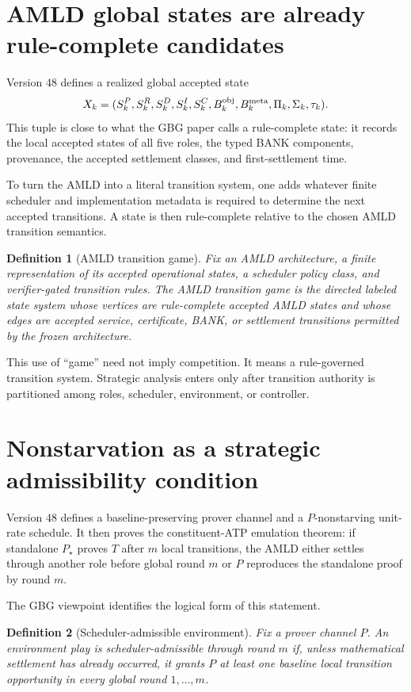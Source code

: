 \documentclass[11pt]{article}
\newtheorem{definition}{Definition}[section]
\theoremstyle{remark}
\begin{document}
\section{AMLD global states are already rule-complete candidates}

Version 48 defines a realized global accepted state
\[
X_k=(S_k^P,S_k^R,S_k^D,S_k^I,S_k^C,
B_k^{\rm obj},B_k^{\rm meta},\Pi_k,\Sigma_k,\tau_k).
\]
This tuple is close to what the GBG paper calls a rule-complete state: it records the local accepted states of all five roles, the typed BANK components, provenance, the accepted settlement classes, and first-settlement time.

To turn the AMLD into a literal transition system, one adds whatever finite scheduler and implementation metadata is required to determine the next accepted transitions. A state is then rule-complete relative to the chosen AMLD transition semantics.

\begin{definition}[AMLD transition game]
Fix an AMLD architecture, a finite representation of its accepted operational states, a scheduler policy class, and verifier-gated transition rules. The AMLD transition game is the directed labeled state system whose vertices are rule-complete accepted AMLD states and whose edges are accepted service, certificate, BANK, or settlement transitions permitted by the frozen architecture.
\end{definition}

This use of ``game'' need not imply competition. It means a rule-governed transition system. Strategic analysis enters only after transition authority is partitioned among roles, scheduler, environment, or controller.

\section{Nonstarvation as a strategic admissibility condition}

Version 48 defines a baseline-preserving prover channel and a $P$-nonstarving unit-rate schedule. It then proves the constituent-ATP emulation theorem: if standalone $P_\star$ proves $T$ after $m$ local transitions, the AMLD either settles through another role before global round $m$ or $P$ reproduces the standalone proof by round $m$.

The GBG viewpoint identifies the logical form of this statement.

\begin{definition}[Scheduler-admissible environment]
Fix a prover channel $P$. An environment play is scheduler-admissible through round $m$ if, unless mathematical settlement has already occurred, it grants $P$ at least one baseline local transition opportunity in every global round $1,\ldots,m$.
\end{definition}
\end{document}
